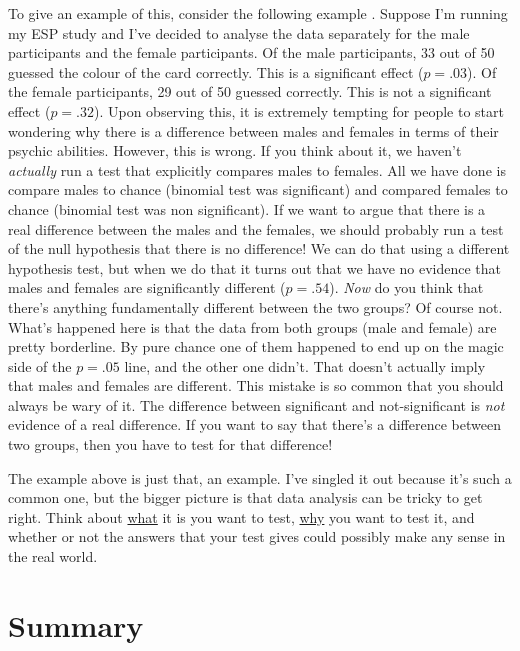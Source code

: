 To give an example of this, consider the following example \parencite[see][]{Gelman2006}. Suppose I'm running my ESP study and I've decided to analyse the data separately for the male participants and the female participants. Of the male participants, 33 out of 50 guessed the colour of the card correctly. This is a significant effect ($p = .03$). Of the female participants, 29 out of 50 guessed correctly. This is not a significant effect ($p = .32$). Upon observing this, it is extremely tempting for people to start wondering why there is a difference between males and females in terms of their psychic abilities. However, this is wrong. If you think about it, we haven't {\it actually} run a test that explicitly compares males to females. All we have done is compare males to chance (binomial test was significant) and compared females to chance (binomial test was non significant). If we want to argue that there is a real difference between the males and the females, we should probably run a test of the null hypothesis that there is no difference! We can do that using a different hypothesis test, but when we do that it turns out that we have no evidence that males and females are significantly different ($p = .54$). {\it Now} do you think that there's anything fundamentally different between the two groups? Of course not. What's happened here is that the data from both groups (male and female) are pretty borderline. By pure chance one of them happened to end up on the magic side of the $p = .05$ line, and the other one didn't. That doesn't actually imply that males and females are different. This mistake is so common that you should always be wary of it. The difference between significant and not-significant is {\it not} evidence of a real difference. If you want to say that there's a difference between two groups, then you have to test for that difference! 

The example above is just that, an example. I've singled it out because it's such a common one, but the bigger picture is that data analysis can be tricky to get right. Think about \underline{what} it is you want to test, \underline{why} you want to test it, and whether or not the answers that your test gives could possibly make any sense in the real world. 


\section{Summary}


